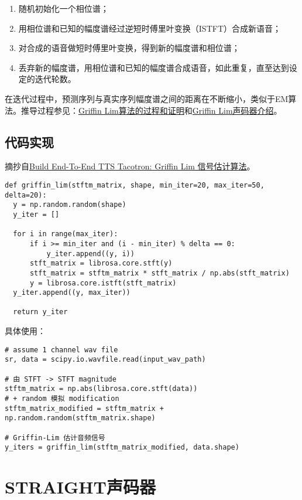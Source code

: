 \documentclass[cn,10pt,math=newtx,citestyle=gb7714-2015,bibstyle=gb7714-2015]{elegantbook}
\begin{document}
\begin{enumerate}
  \item 随机初始化一个相位谱；
  \item 用相位谱和已知的幅度谱经过逆短时傅里叶变换（ISTFT）合成新语音；
  \item 对合成的语音做短时傅里叶变换，得到新的幅度谱和相位谱；
  \item 丢弃新的幅度谱，用相位谱和已知的幅度谱合成语音，如此重复，直至达到设定的迭代轮数。
\end{enumerate}

在迭代过程中，预测序列与真实序列幅度谱之间的距离在不断缩小，类似于EM算法。推导过程参见：\href{https://zhuanlan.zhihu.com/p/102539783}{Griffin Lim算法的过程和证明}和\href{https://zhuanlan.zhihu.com/p/66809424}{Griffin Lim声码器介绍}。


\subsection{代码实现}

摘抄自\href{https://zhuanlan.zhihu.com/p/25002923}{Build End-To-End TTS Tacotron: Griffin Lim 信号估计算法}。

\begin{lstlisting}
def griffin_lim(stftm_matrix, shape, min_iter=20, max_iter=50, delta=20):
  y = np.random.random(shape)
  y_iter = []

  for i in range(max_iter):
      if i >= min_iter and (i - min_iter) % delta == 0:
          y_iter.append((y, i))
      stft_matrix = librosa.core.stft(y)
      stft_matrix = stftm_matrix * stft_matrix / np.abs(stft_matrix)
      y = librosa.core.istft(stft_matrix)
  y_iter.append((y, max_iter))

  return y_iter
\end{lstlisting}

具体使用：

\begin{lstlisting}
# assume 1 channel wav file
sr, data = scipy.io.wavfile.read(input_wav_path)

# 由 STFT -> STFT magnitude
stftm_matrix = np.abs(librosa.core.stft(data))
# + random 模拟 modification
stftm_matrix_modified = stftm_matrix + np.random.random(stftm_matrix.shape)

# Griffin-Lim 估计音频信号
y_iters = griffin_lim(stftm_matrix_modified, data.shape)
\end{lstlisting}


\section{STRAIGHT声码器}
\end{document}
